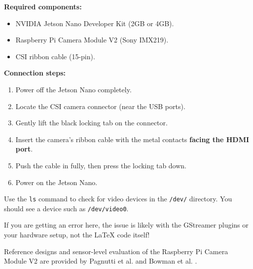 {
\textbf{Required components:}
\begin{itemize}
	\item NVIDIA Jetson Nano Developer Kit (2GB or 4GB).
	\item Raspberry Pi Camera Module V2 (Sony IMX219).
	\item CSI ribbon cable (15-pin).
\end{itemize}
\vspace{2mm}
\textbf{Connection steps:}
\begin{enumerate}
	\item Power off the Jetson Nano completely.
	\item Locate the CSI camera connector (near the USB ports).
	\item Gently lift the black locking tab on the connector.
	\item Insert the camera’s ribbon cable with the metal contacts \textbf{facing the HDMI port}.
	\item Push the cable in fully, then press the locking tab down.
	\item Power on the Jetson Nano.
\end{enumerate}
\vspace{2mm}
}
{
	Use the \texttt{ls} command to check for video devices in the \texttt{/dev/} directory.
	You should see a device such as \texttt{/dev/video0}.
	
	
	
	If you are getting an error here, the issue is likely with the GStreamer plugins or your hardware setup, not the LaTeX code itself!
	
	Reference designs and sensor-level evaluation of the Raspberry Pi Camera Module V2 are provided by Pagnutti et al. \cite{Pagnutti:2017} and Bowman et al. \cite{Bowman:2020}.
}


